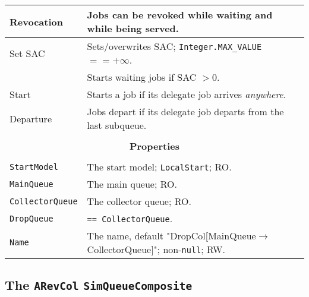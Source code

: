 \begin{tabular}{|l|l|}
	\hline
	Revocation & Jobs can be revoked while waiting and while being served. \\
	\hline
	Set SAC & Sets/overwrites SAC; \lstinline|Integer.MAX_VALUE| $== +\infty$. \\
	& Starts waiting jobs if SAC $> 0$. \\
	\hline
	Start & Starts a job if its delegate job arrives {\em anywhere}. \\
	\hline
	Departure & Jobs depart if its delegate job departs from the last subqueue. \\
	\hline
	\multicolumn{2}{|c|}{} \\
	\multicolumn{2}{|c|}{\bf Properties} \\
	\multicolumn{2}{|c|}{} \\
	\hline
	\lstinline|StartModel|    & The start model; \lstinline|LocalStart|; RO. \\
	\hline
	\lstinline|MainQueue| & The main queue; RO. \\
	\hline
	\lstinline|CollectorQueue| & The collector queue; RO. \\
	\hline
	\lstinline|DropQueue| & \lstinline|== CollectorQueue|. \\
	\hline
	\lstinline|Name|          & The name, default "DropCol[MainQueue$\rightarrow$CollectorQueue]"; non-\lstinline|null|; RW. \\
	\hline
\end{tabular}

\subsection{The \lstinline{ARevCol} \lstinline{SimQueueComposite}}
\label{sec:ARevCol}

